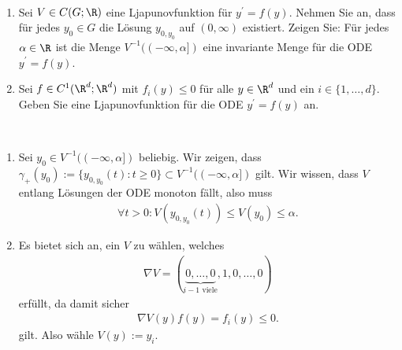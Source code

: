 \begin{exercise}
\leavevmode \\
\begin{enumerate}[label = \textbf{\alph*)}]
  \item Sei $V \in C(G;\R)$ eine Ljapunovfunktion für $y^{\prime} = f(y)$. Nehmen Sie
  an, dass für jedes $y_0 \in G$ die Lösung $y_{0,y_0}$ auf $(0,\infty)$ existiert.
  Zeigen Sie: Für jedes $\alpha \in \R$ ist die Menge $V^{-1}((-\infty,\alpha])$
  eine invariante Menge für die ODE $y^{\prime} = f(y)$.
  \item Sei $f \in C^1(\R^d;\R^d)$ mit $f_i(y) \leq 0$ für alle $y \in \R^d$
  und ein $i \in \{1,\dots,d\}$. Geben Sie eine Ljapunovfunktion für die ODE
  $y^{\prime} = f(y)$ an.
\end{enumerate}
\end{exercise}
\begin{solution}
\leavevmode \\
\begin{enumerate}
  \item Sei $y_0 \in V^{-1}((-\infty,\alpha])$ beliebig. Wir zeigen, dass
  $\gamma_+(y_0) := \{y_{0,y_0}(t): t \geq 0\} \subset V^{-1}((-\infty,\alpha])$ gilt.
  Wir wissen, dass $V$ entlang Lösungen der ODE monoton fällt, also muss
  \begin{align*}
    \forall t > 0: V(y_{0,y_0}(t)) \leq V(y_0) \leq \alpha.
  \end{align*}
  \item Es bietet sich an, ein $V$ zu wählen, welches
  \begin{align*}
    \nabla V = (\underbrace{0,\dots,0}_{i - 1 \text{ viele}},1,0,\dots,0)
  \end{align*}
  erfüllt, da damit sicher
  \begin{align*}
    \nabla V(y) f(y) = f_i(y) \leq 0.
  \end{align*}
  gilt. Also wähle $V(y) := y_i$.
\end{enumerate}
\end{solution}
